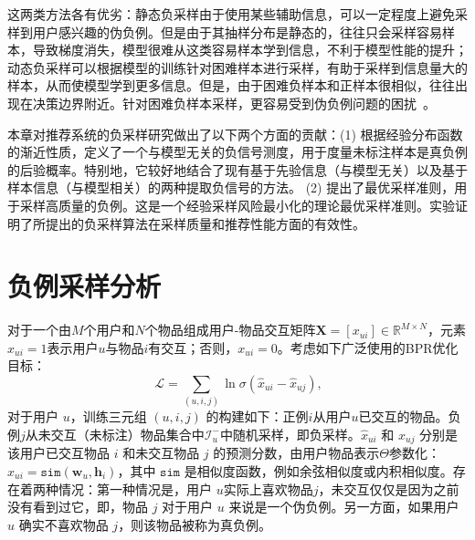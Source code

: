 这两类方法各有优劣：静态负采样由于使用某些辅助信息，可以一定程度上避免采样到用户感兴趣的伪负例。但是由于其抽样分布是静态的，往往只会采样容易样本，导致梯度消失，模型很难从这类容易样本学到信息，不利于模型性能的提升；动态负采样可以根据模型的训练针对困难样本进行采样，有助于采样到信息量大的样本，从而使模型学到更多信息。但是，由于困难负样本和正样本很相似，往往出现在决策边界附近。针对困难负样本采样，更容易受到伪负例问题的困扰~\cite{Ding:2020:NIPS,Qin:2021:AAAI,Zhao:2021:IJCAI}。

本章对推荐系统的负采样研究做出了以下两个方面的贡献：(1) 根据经验分布函数的渐近性质，定义了一个与模型无关的负信号测度，用于度量未标注样本是真负例的后验概率。特别地，它较好地结合了现有基于先验信息（与模型无关）以及基于样本信息（与模型相关）的两种提取负信号的方法。 (2) 提出了最优采样准则，用于采样高质量的负例。这是一个经验采样风险最小化的理论最优采样准则。实验证明了所提出的负采样算法在采样质量和推荐性能方面的有效性。

\section{负例采样分析}
对于一个由$M$个用户和$N$个物品组成用户-物品交互矩阵$\mathbf{X}=[x_{ui}] \in \mathbb{R}^{M\times N}$，元素$x_{ui}=1$表示用户$u$与物品$i$有交互；否则，$x_{ui}=0$。考虑如下广泛使用的BPR优化目标：
\begin{equation}\label{Eq:PairewiseLossFunction}\
	\mathcal{L} = \sum_{(u,i,j)} \ln \sigma(\hat{x}_{ui} - \hat{x}_{uj}) ,
\end{equation}
对于用户 $u$，训练三元组 $(u,i,j)$ 的构建如下：正例$i$从用户$u$已交互的物品。负例$j$从未交互（未标注）物品集合中$\mathcal{I}_u^-$中随机采样，即负采样。$\hat{x}_{ui}$ 和 $\hat{x}_{uj}$ 分别是该用户已交互物品 $i$ 和未交互物品 $j$ 的预测分数，由用户物品表示$\Theta$参数化：$\hat{x}_{ui} = \mathtt{sim}(\mathbf{w}_u, \mathbf{h}_i)$，其中 $\mathtt{sim}$ 是相似度函数，例如余弦相似度或内积相似度。存在着两种情况：第一种情况是，用户 $u$实际上喜欢物品$j$，未交互仅仅是因为之前没有看到过它，即，物品 $j$ 对于用户 $u$ 来说是一个伪负例。另一方面，如果用户 $u$ 确实不喜欢物品 $j$，则该物品被称为真负例。

